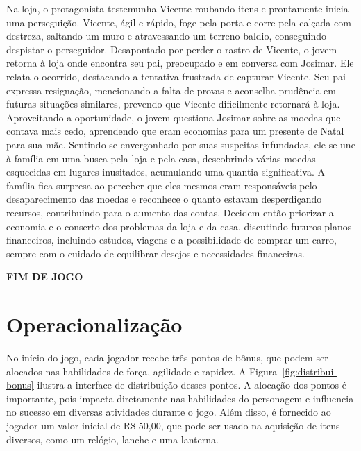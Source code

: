 Na loja, o protagonista testemunha Vicente roubando itens e prontamente inicia uma perseguição. Vicente, ágil e rápido, foge pela porta e corre pela calçada com destreza, saltando um muro e atravessando um terreno baldio, conseguindo despistar o perseguidor. Desapontado por perder o rastro de Vicente, o jovem retorna à loja onde encontra seu pai, preocupado e em conversa com Josimar. Ele relata o ocorrido, destacando a tentativa frustrada de capturar Vicente. Seu pai expressa resignação, mencionando a falta de provas e aconselha prudência em futuras situações similares, prevendo que Vicente dificilmente retornará à loja. Aproveitando a oportunidade, o jovem questiona Josimar sobre as moedas que contava mais cedo, aprendendo que eram economias para um presente de Natal para sua mãe. Sentindo-se envergonhado por suas suspeitas infundadas, ele se une à família em uma busca pela loja e pela casa, descobrindo várias moedas esquecidas em lugares inusitados, acumulando uma quantia significativa. A família fica surpresa ao perceber que eles mesmos eram responsáveis pelo desaparecimento das moedas e reconhece o quanto estavam desperdiçando recursos, contribuindo para o aumento das contas. Decidem então priorizar a economia e o conserto dos problemas da loja e da casa, discutindo futuros planos financeiros, incluindo estudos, viagens e a possibilidade de comprar um carro, sempre com o cuidado de equilibrar desejos e necessidades financeiras.

\textbf{FIM DE JOGO}

\section{Operacionalização}

No início do jogo, cada jogador recebe três pontos de bônus, que podem ser alocados nas habilidades de força, agilidade e rapidez. A Figura~\ref{fig:distribui-bonus} ilustra a interface de distribuição desses pontos. A alocação dos pontos é importante, pois impacta diretamente nas habilidades do personagem e influencia no sucesso em diversas atividades durante o jogo. Além disso, é fornecido ao jogador um valor inicial de R\$ 50,00, que pode ser usado na aquisição de itens diversos, como um relógio, lanche e uma lanterna.

